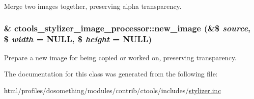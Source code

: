 \label{classctools__stylizer__image__processor_ad1e623018b023fc6cc484759778b4bbd}
Merge two images together, preserving alpha transparency. \hypertarget{classctools__stylizer__image__processor_a8242ea0531974515e857839f22cbc260}{
\subsubsection[{new\_\-image}]{\setlength{\rightskip}{0pt plus 5cm}\& ctools\_\-stylizer\_\-image\_\-processor::new\_\-image (\&\$ {\em source}, \/  \$ {\em width} = {\ttfamily NULL}, \/  \$ {\em height} = {\ttfamily NULL})}}
\label{classctools__stylizer__image__processor_a8242ea0531974515e857839f22cbc260}
Prepare a new image for being copied or worked on, preserving transparency. 

The documentation for this class was generated from the following file:\begin{DoxyCompactItemize}
\item 
html/profiles/dosomething/modules/contrib/ctools/includes/\hyperlink{includes_2stylizer_8inc}{stylizer.inc}\end{DoxyCompactItemize}
